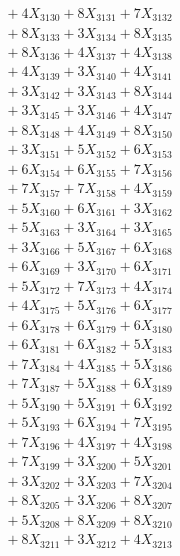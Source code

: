 \documentclass[a4paper,10pt]{article}
\begin{document}
{\begin{align}
&\;  + 4 X_{3130} + 8 X_{3131} + 7 X_{3132} \\[0.3ex]
&\;  + 8 X_{3133} + 3 X_{3134} + 8 X_{3135} \\[0.3ex]
&\;  + 8 X_{3136} + 4 X_{3137} + 4 X_{3138} \\[0.3ex]
&\;  + 4 X_{3139} + 3 X_{3140} + 4 X_{3141} \\[0.3ex]
&\;  + 3 X_{3142} + 3 X_{3143} + 8 X_{3144} \\[0.3ex]
&\;  + 3 X_{3145} + 3 X_{3146} + 4 X_{3147} \\[0.3ex]
&\;  + 8 X_{3148} + 4 X_{3149} + 8 X_{3150} \\[0.3ex]
&\;  + 3 X_{3151} + 5 X_{3152} + 6 X_{3153} \\[0.3ex]
&\;  + 6 X_{3154} + 6 X_{3155} + 7 X_{3156} \\[0.3ex]
&\;  + 7 X_{3157} + 7 X_{3158} + 4 X_{3159} \\[0.5ex]\allowbreak
&\;  + 5 X_{3160} + 6 X_{3161} + 3 X_{3162} \\[0.3ex]
&\;  + 5 X_{3163} + 3 X_{3164} + 3 X_{3165} \\[0.3ex]
&\;  + 3 X_{3166} + 5 X_{3167} + 6 X_{3168} \\[0.3ex]
&\;  + 6 X_{3169} + 3 X_{3170} + 6 X_{3171} \\[0.3ex]
&\;  + 5 X_{3172} + 7 X_{3173} + 4 X_{3174} \\[0.3ex]
&\;  + 4 X_{3175} + 5 X_{3176} + 6 X_{3177} \\[0.3ex]
&\;  + 6 X_{3178} + 6 X_{3179} + 6 X_{3180} \\[0.3ex]
&\;  + 6 X_{3181} + 6 X_{3182} + 5 X_{3183} \\[0.3ex]
&\;  + 7 X_{3184} + 4 X_{3185} + 5 X_{3186} \\[0.3ex]
&\;  + 7 X_{3187} + 5 X_{3188} + 6 X_{3189} \\[0.5ex]\allowbreak
&\;  + 5 X_{3190} + 5 X_{3191} + 6 X_{3192} \\[0.3ex]
&\;  + 5 X_{3193} + 6 X_{3194} + 7 X_{3195} \\[0.3ex]
&\;  + 7 X_{3196} + 4 X_{3197} + 4 X_{3198} \\[0.3ex]
&\;  + 7 X_{3199} + 3 X_{3200} + 5 X_{3201} \\[0.3ex]
&\;  + 3 X_{3202} + 3 X_{3203} + 7 X_{3204} \\[0.3ex]
&\;  + 8 X_{3205} + 3 X_{3206} + 8 X_{3207} \\[0.3ex]
&\;  + 5 X_{3208} + 8 X_{3209} + 8 X_{3210} \\[0.3ex]
&\;  + 8 X_{3211} + 3 X_{3212} + 4 X_{3213} \\[0.3ex]

\end{align}}
\end{document}
